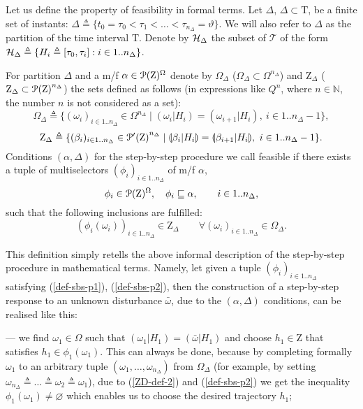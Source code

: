 \documentclass[sn-mathphys,Numbered,pdflatex]{sn-jnl}%
\theoremstyle{thmstyleone}%
\theoremstyle{thmstyletwo}%
\theoremstyle{thmstylethree}%
\newcommand{\nint}[2]{{{#1}..{#2}}}%
\newcommand{\beq}{\begin{equation}}
\newcommand{\eeq}{\end{equation}}
\newcommand{\mydef}{\mathrel{\triangleq}}%
\newcommand{\icP}[1]{\EuScript{P}({#1})}%
\newcommand{\icPp}[1]{\EuScript{P^\prime}({#1})}%
\newcommand{\res}[2]{\ensuremath{(#1|#2)}}%
\newcommand{\myLe}{\mathrel{\sqsubseteq}}%
\newcommand{\NA}{\ensuremath{\mathbb N}}%
\newcommand{\naOm}{\ensuremath{\Omega}}%
\newcommand{\naZ}{\ensuremath{\mathrm{Z}}}%
\newcommand{\naT}{\ensuremath{\mathrm{T}}}%
\newcommand{\naTc}{\ensuremath{\mathcal{T}}}%
\newcommand{\sres}[2]{\llparenthesis#1|#2\rrparenthesis}%
\newcommand{\fref}[1]{{\rm(\ref{#1})}}   %
\begin{document}
Let us define the property of feasibility in formal terms.
Let $\Delta$, $\Delta\subset\naT$, be a finite set of instants: $\Delta\mydef\{t_0=\tau_0<\tau_1<\ldots<\tau_{n_\Delta}=\vartheta \}$.
We will also refer to $\Delta$ as the partition of the time interval \naT.
Denote by ${\cal H}_\Delta$ the subset of $\naTc$ of the form ${\cal H}_\Delta\mydef\{H_i\mydef[\tau_0,\tau_i]: i\in\nint1{n_\Delta}\}$.

For partition $\Delta$ and a m/f $\alpha\in\icP\naZ^\naOm$ denote by $\naOm_\Delta$ ($\naOm_\Delta\subset\naOm^{n_\Delta}$) and $\naZ_\Delta$ ($\naZ_\Delta\subset{\icP\naZ}^{n_ \Delta}$) the sets defined as follows (in expressions like $Q^n$, where $n\in\NA$, the number $n$ is not considered as a set):
\beq\label{OD-def-2}
\naOm_\Delta\mydef\{(\omega_i)_{i\in\nint1{n_\Delta}}\in\naOm^{n_\Delta}\mid\res{\omega_i}{H_{i}}=\res{\omega_{i+1}}{H_{i}},\ i\in\nint1{n_\Delta-1}\},
\eeq
\beq\label{ZD-def-2}
\naZ_\Delta\mydef\{({\beta}_i)_{i\in\nint1{n_\Delta}}\in{\icPp\naZ}^{n_\Delta}\mid\sres{{\beta}_i}{H_{i}}=\sres{{\beta}_{i+1}}{H_{i}},\ i\in\nint1{n_\Delta -1}\}.
\eeq
Conditions $(\alpha, \Delta)$ for the step-by-step procedure we call feasible if there exists a tuple of multiselectors $(\phi_i)_{i\in\nint1{n_\Delta}}$ of  m/f $\alpha$,
\beq\label{def-sbs-p1}
\phi_i\in\icP\naZ^\naOm,\quad\phi_i\myLe\alpha,\qquad i\in\nint1{n_\Delta},
\eeq
such that the following inclusions are fulfilled:
\beq\label{def-sbs-p2}
(\phi_i(\omega_i))_{i\in\nint1{n_\Delta}}\in\naZ_\Delta\qquad\forall (\omega_i)_{i\in\nint1{n_\Delta}}\in\naOm_\Delta.
\eeq


This definition simply retells the above informal description of the step-by-step procedure in mathematical terms.
Namely, let given a tuple $(\phi_i)_{i\in\nint1{n_\Delta}}$ satisfying \fref{def-sbs-p1}, \fref{def-sbs-p2}, then the construction of a step-by-step response to an unknown disturbance $\bar\omega$, due to the $(\alpha,\Delta)$ conditions, can be realised like this:

--- we find $\omega_1\in\naOm$ such that $\res{\omega_1}{H_1}=\res{\bar\omega}{H_1} $ and choose $h_1\in\naZ$ that satisfies $h_1\in\phi_1(\omega_1)$.
This can always be done, because by completing formally $\omega_1$ to an arbitrary tuple $(\omega_1,\ldots,\omega_{n_\Delta})$ from $\naOm_\Delta$ (for example, by setting $\omega_{n_\Delta}\mydef\ldots\mydef\omega_2\mydef\omega_1$), due to \fref{ZD-def-2} and \fref{def-sbs-p2} we get the inequality $\phi_1(\omega_1)\neq\varnothing$ which enables us to choose the desired trajectory $h_1$;
\end{document}
